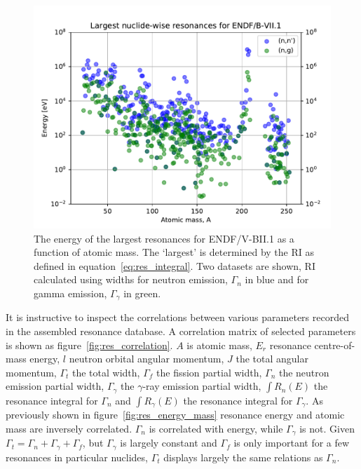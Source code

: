 \begin{figure}[H]
  \centering
  \includegraphics[width=\linewidth]{largest_res_energy_scatter}
  \caption[Energies of the largest resonances as a function of atomic mass.]{The energy of the largest resonances for ENDF/V-BII.1 as a function of atomic mass. The `largest' is determined by the RI as defined in equation~\ref{eq:res_integral}. Two datasets are shown, RI calculated using widths for neutron emission, $\Gamma_{n}$ in blue and for gamma emission, $\Gamma_{\gamma}$ in green.}
  \label{fig:largest_res_energy_scatter}
\end{figure}

It is instructive to inspect the correlations between various parameters recorded in the assembled resonance database. A correlation matrix of selected parameters is shown as figure~\ref{fig:res_correlation}. $A$ is atomic mass, $E_{r}$ resonance centre-of-mass energy, $l$ neutron orbital angular momentum, $J$ the total angular momentum, $\Gamma_{t}$ the total width, $\Gamma_{f}$ the fission partial width, $\Gamma_{n}$ the neutron emission partial width, $\Gamma_{\gamma}$ the $\gamma$-ray emission partial width, $\int R_{n}(E)$ the resonance integral for $\Gamma_{n}$ and $\int R_{\gamma}(E)$ the resonance integral for $\Gamma_{\gamma}$. As previously shown in figure~\ref{fig:res_energy_mass} resonance energy and atomic mass are inversely correlated. $\Gamma_{n}$ is correlated with energy, while $\Gamma_{\gamma}$ is not. Given $\Gamma_{t} = \Gamma_{n} + \Gamma_{\gamma} + \Gamma_{f}$, but $\Gamma_{\gamma}$ is largely constant and $\Gamma_{f}$ is only important for a few resonances in particular nuclides, $\Gamma_{t}$ displays largely the same relations as $\Gamma_{n}$.  

